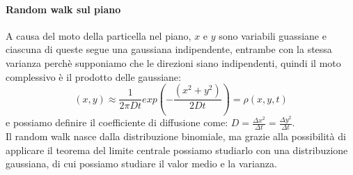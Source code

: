 \documentclass[12pt]{article}
\begin{document}
\paragraph*{Random walk sul piano \\}
A causa del moto della particella nel piano, $x$ e $y$ sono variabili guassiane e ciascuna di queste segue una gaussiana indipendente, entrambe con la stessa varianza perchè supponiamo che le direzioni siano indipendenti, quindi il moto complessivo è il prodotto delle gaussiane:
\begin{equation}
	(x,y) \approx \frac{1}{2\pi Dt}exp\left(-\frac{(x^2+y^2)}{2Dt}\right) = \rho(x,y,t)
\end{equation}
e possiamo definire il coefficiente di diffusione come: $D = \frac{\Delta x^2}{\Delta t} = \frac{\Delta y^2}{\Delta t}$. \\
Il random walk nasce dalla distribuzione binomiale, ma grazie alla possibilità di applicare il teorema del limite centrale possiamo studiarlo con una distribuzione gaussiana, di cui possiamo studiare il valor medio e la varianza. 
\end{document}
